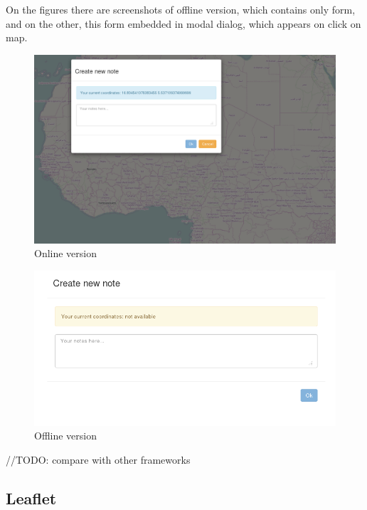 \documentclass[12pt,a4paper]{article}
\begin{document}
On the figures there are screenshots of offline version, which contains only form,
and on the other, this form embedded in modal dialog, which appears on click on map.

    \begin{figure}[h]
      \begin{center}
        \includegraphics[width=\textwidth]{res/online}
      \end{center}
      \caption{Online version}
    \end{figure}

    \begin{figure}[h]
      \begin{center}
        \includegraphics[width=\textwidth]{res/offline}
      \end{center}
      \caption{Offline version}
    \end{figure}

//TODO: compare with other frameworks

\subsection{Leaflet}
\end{document}
